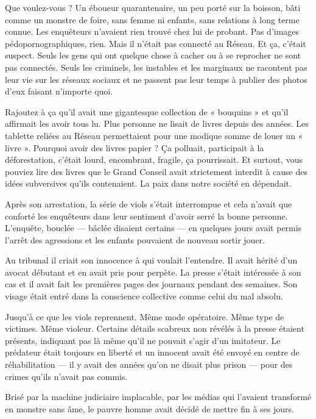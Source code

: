 Que voulez-vous ? Un éboueur quarantenaire, un peu porté sur la boisson, bâti comme un monstre de foire, sans femme ni
enfants, sans relations à long terme connue. Les enquêteurs n'avaient rien trouvé chez lui de probant. Pas d'images
pédopornographiques, rien. Mais il n'était pas connecté au Réseau. Et ça, c'était suspect. Seuls les gens qui ont
quelque chose à cacher ou à se reprocher ne sont pas connectés. Seuls les criminels, les instables et les marginaux ne
racontent pas leur vie sur les réseaux sociaux et ne passent pas leur temps à publier des photos d'eux faisant
n'importe quoi.

Rajoutez à ça qu'il avait une gigantesque collection de « bouquins » et qu'il affirmait les avoir tous lu. Plus
personne ne lisait de livres depuis des années. Les tablette reliées au Réseau permettaient pour une modique somme de
louer un « livre ». Pourquoi avoir des livres papier ? Ça polluait, participait à la déforestation, c'était lourd,
encombrant, fragile, ça pourrissait. Et surtout, vous pouviez lire des livres que le Grand Conseil avait strictement
interdit à cause des idées subversives qu'ils contenaient. La paix dans notre société en dépendait.

Après son arrestation, la série de viols s'était interrompue et cela n'avait que conforté les enquêteurs dans leur
sentiment d'avoir serré la bonne personne. L'enquête, bouclée — bâclée disaient certains — en quelques jours avait
permis l'arrêt des agressions et les enfants pouvaient de nouveau sortir jouer.

Au tribunal il criait son innocence à qui voulait l'entendre. Il avait hérité d'un avocat débutant et en avait pris pour
perpète. La presse s'était intéressée à son cas et il avait fait les premières pages des journaux pendant des semaines.
Son visage était entré dans la conscience collective comme celui du mal absolu.

Jusqu'à ce que les viols reprennent. Même mode opératoire. Même type de victimes. Même violeur. Certains détails
scabreux non révélés à la presse étaient présents, indiquant pas là même qu'il ne pouvait s'agir d'un imitateur. Le
prédateur était toujours en liberté et un innocent avait été envoyé en centre de réhabilitation — il y avait des années
qu'on ne disait plus prison — pour des crimes qu'ils n'avait pas commis.

Brisé par la machine judiciaire implacable, par les médias qui l'avaient transformé en monstre sans âme, le pauvre homme
avait décidé de mettre fin à ses jours.

